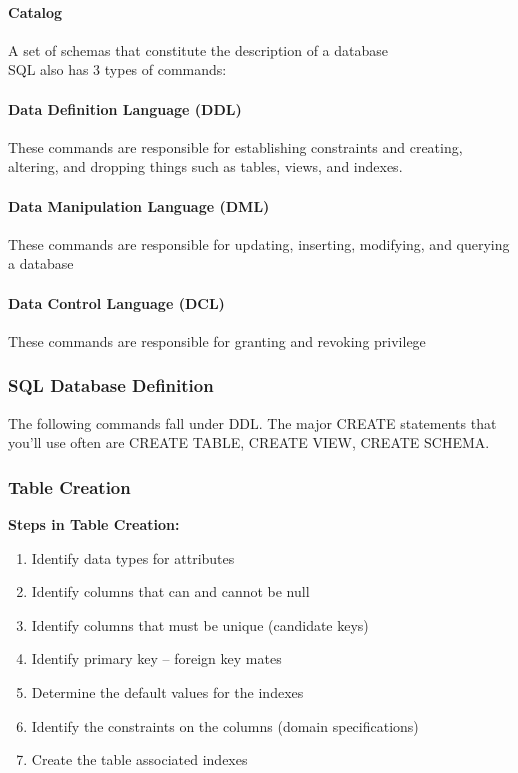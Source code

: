 \documentclass[12pt]{article}
\begin{document}
\paragraph{Catalog} A set of schemas that constitute the description of a database
\\
SQL also has 3 types of commands:\\
\paragraph{Data Definition Language (DDL)} These commands are responsible for establishing constraints and creating, altering, and dropping things such as tables, views, and indexes.
\paragraph{Data Manipulation Language (DML)} These commands are responsible for updating, inserting, modifying, and querying a database
\paragraph{Data Control Language (DCL)} These commands are responsible for granting and revoking privilege

\subsubsection{SQL Database Definition}

The following commands fall under DDL. The major CREATE statements that you'll use often are CREATE TABLE, CREATE VIEW, CREATE SCHEMA.

\subsubsection{Table Creation}

\textbf{Steps in Table Creation:}
\begin{enumerate}
	\item{Identify data types for attributes}
	\item{Identify columns that can and cannot be null}
	\item{Identify columns that must be unique (candidate keys)}
	\item{Identify primary key -- foreign key mates}
	\item{Determine the default values for the indexes}
	\item{Identify the constraints on the columns (domain specifications)}
	\item{Create the table associated indexes}
\end{enumerate}
\end{document}
